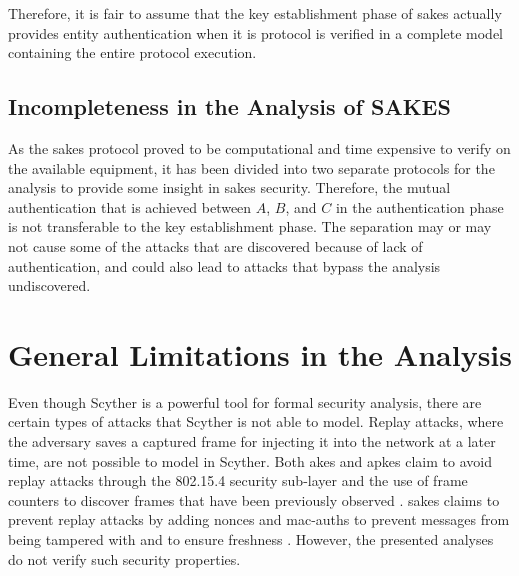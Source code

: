Therefore, it is fair to assume that the key establishment phase of \gls{sakes} actually provides entity authentication when it is protocol is verified in a complete model containing the entire protocol execution. 


\subsection{Incompleteness in the Analysis of SAKES}

As the \gls{sakes} protocol proved to be computational and time expensive to verify on the available equipment, it has been divided into two separate protocols for the analysis to provide some insight in \gls{sakes} security. Therefore, the mutual authentication that is achieved between $A$, $B$, and $C$ in the authentication phase is not transferable to the key establishment phase. The separation may or may not cause some of the attacks that are discovered because of lack of authentication, and could also lead to attacks that bypass the analysis undiscovered.

\section{General Limitations in the Analysis}

Even though Scyther is a powerful tool for formal security analysis, there are certain types of attacks that Scyther is not able to model. Replay attacks, where the adversary saves a captured frame for injecting it into the network at a later time, are not possible to model in Scyther. Both \gls{akes} and \gls{apkes} claim to avoid replay attacks through the 802.15.4 security sub-layer and the use of frame counters to discover frames that have been previously observed \cite{krentz2015handling, krentz20136lowpan}. \gls{sakes} claims to prevent replay attacks by adding nonces and \gls{mac-auth}s to prevent messages from being tampered with and to ensure freshness \cite{hussen2013sakes}. However, the presented analyses do not verify such security properties.








